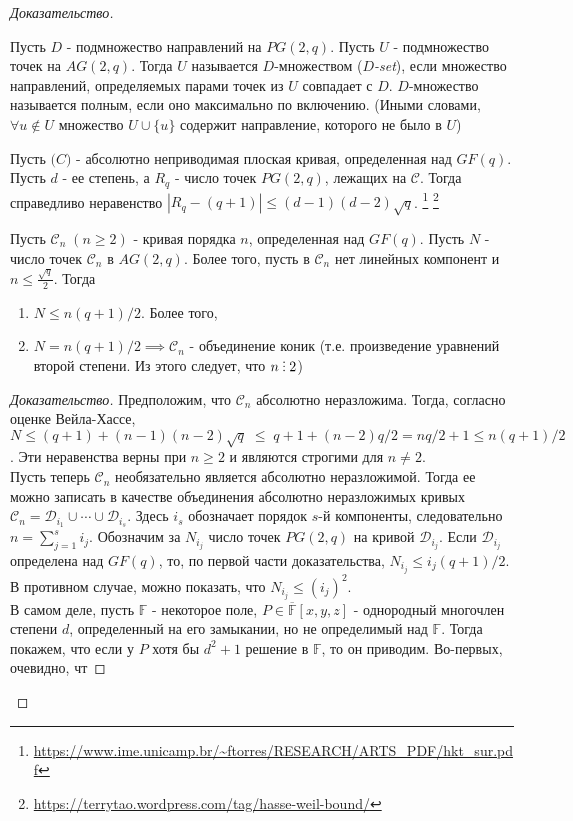 \documentclass{article}
\newenvironment{theorem}[2][Теорема]{\begin{trivlist}
\item[\hskip \labelsep {\bfseries #1}\hskip \labelsep {\bfseries #2.}]}{\end{trivlist}}
\newenvironment{definition}[2][Определение]{\begin{trivlist}
\item[\hskip \labelsep {\bfseries #1}\hskip \labelsep {\bfseries #2.}]}{\end{trivlist}}
\newenvironment{lemma}[2][Лемма]{\begin{trivlist}
\item[\hskip \labelsep {\bfseries #1}\hskip \labelsep {\bfseries #2.}]}{\end{trivlist}}
\newenvironment{solution}{\begin{proof}[Доказательство]}{\end{proof}}
\newcommand{\divby}{\ \tikz \foreach \y in {0ex, 0.65ex, 1.3ex} \fill (0,\y) circle (0.5pt);\ }
\begin{document}
\begin{solution}{}
$ $
\begin{definition}{1}
Пусть $D$ - подмножество направлений на $PG(2,q)$. Пусть $U$ - подмножество точек на $AG(2,q)$. Тогда $U$ называется $D$-множеством (\emph{$D$-set}), если множество направлений, определяемых парами точек из $U$ совпадает с $D$. $D$-множество называется полным, если оно максимально по включению. (Иными словами, $\forall{u}\notin U$ множество $U\cup \{u\}$ содержит направление, которого не было в $U$)
\end{definition}
\begin{theorem}{(Andre Weil, Helmut Hasse, 1948)}
Пусть $\mathscr(C)$ - абсолютно неприводимая плоская кривая, определенная над $GF(q)$. Пусть $d$ - ее степень, а $R_q$ - число точек $PG(2,q)$, лежащих на $\mathscr{C}$. Тогда справедливо неравенство $|R_q-(q+1)|\le(d-1)(d-2)\sqrt{q}$.
\footnote{\url{https://www.ime.unicamp.br/~ftorres/RESEARCH/ARTS_PDF/hkt_sur.pdf}}
\footnote{\url{https://terrytao.wordpress.com/tag/hasse-weil-bound/}}
\end{theorem}
\begin{lemma}{1}
Пусть $\mathscr{C}_n\;(n\ge2)$ - кривая порядка $n$, определенная над $GF(q)$. Пусть $N$ - число точек $\mathscr{C}_n$ в $AG(2,q)$. Более того, пусть в $\mathscr{C}_n$ нет линейных компонент и $n\le\frac{\sqrt{q}}{2}$. Тогда
\begin{enumerate}
\item[(1)]{$N\le n(q+1)/2$. Более того,}
\item[(2)]{$N=n(q+1)/2\implies\mathscr{C}_n$ - объединение коник (т.е. произведение уравнений второй степени. Из этого следует, что $n\divby2$)}
\end{enumerate}
\end{lemma}
\begin{solution}\renewcommand{\qedsymbol}{}
Предположим, что $\mathscr{C}_n$ абсолютно неразложима. Тогда, согласно оценке Вейла-Хассе,
$N\le (q+1) + (n-1)(n-2)\sqrt{q}\; \le\; q+1+(n-2)q/2 = nq/2 + 1 \le n(q+1)/2$. Эти неравенства верны при $n\ge2$ и являются строгими для $n\neq2$.
\\

\noindent Пусть теперь $\mathscr{C}_n$ необязательно является абсолютно неразложимой. Тогда ее можно записать в качестве объединения абсолютно неразложимых кривых $\mathscr{C}_n = 
\mathscr{D}_{i_1}\cup\cdots\cup\mathscr{D}_{i_s}$. Здесь $i_s$ обозначает порядок $s$-й компоненты, следовательно $n=\sum\limits_{j=1}^{s}{i_j}$. Обозначим за $N_{i_j}$ число точек $PG(2,q)$ на кривой $\mathscr{D}_{i_j}$. Если $\mathscr{D}_{i_j}$ определена над $GF(q)$, то, по первой части доказательства, $N_{i_j}\le i_j(q+1)/2$. В противном случае, можно показать, что $N_{i_j}\le(i_j)^2$.
\\

\noindent В самом деле, пусть $\mathbb{F}$ - некоторое поле, $P\in\overline{\mathbb{F}}[x,y,z]$ - однородный многочлен степени $d$, определенный на его замыкании, но не определимый над $\mathbb{F}$. Тогда покажем, что если у $P$ хотя бы $d^2+1$ решение в $\mathbb{F}$, то он приводим. Во-первых, очевидно, чт

\end{solution}
\end{solution}{}
\end{document}

